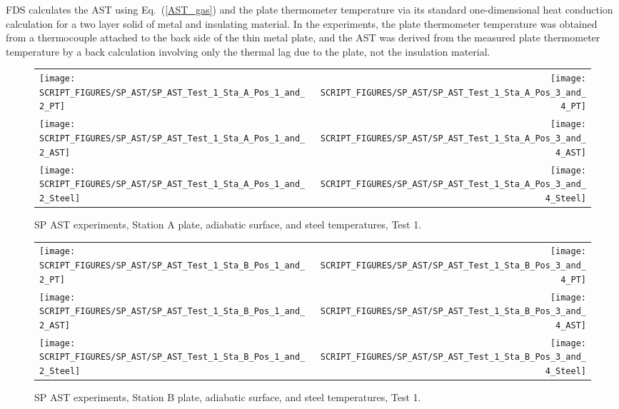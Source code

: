 FDS calculates the AST using Eq.~(\ref{AST_gas}) and the plate thermometer temperature via its standard one-dimensional heat conduction calculation for a
two layer solid of metal and insulating material. In the experiments, the plate thermometer temperature was obtained from a thermocouple attached to the back side of
the thin metal plate, and the AST was derived from the measured plate thermometer temperature by a back calculation involving only the thermal lag due to the
plate, not the insulation material.

\newpage


\begin{figure}[p]
\begin{tabular*}{\textwidth}{l@{\extracolsep{\fill}}r}
\texttt{[image: SCRIPT\_FIGURES/SP\_AST/SP\_AST\_Test\_1\_Sta\_A\_Pos\_1\_and\_2\_PT]} &
\texttt{[image: SCRIPT\_FIGURES/SP\_AST/SP\_AST\_Test\_1\_Sta\_A\_Pos\_3\_and\_4\_PT]} \\
\texttt{[image: SCRIPT\_FIGURES/SP\_AST/SP\_AST\_Test\_1\_Sta\_A\_Pos\_1\_and\_2\_AST]} &
\texttt{[image: SCRIPT\_FIGURES/SP\_AST/SP\_AST\_Test\_1\_Sta\_A\_Pos\_3\_and\_4\_AST]} \\
\texttt{[image: SCRIPT\_FIGURES/SP\_AST/SP\_AST\_Test\_1\_Sta\_A\_Pos\_1\_and\_2\_Steel]} &
\texttt{[image: SCRIPT\_FIGURES/SP\_AST/SP\_AST\_Test\_1\_Sta\_A\_Pos\_3\_and\_4\_Steel]}
\end{tabular*}
\caption{SP AST experiments, Station A plate, adiabatic surface, and steel temperatures, Test 1.}
\label{SP_Test_1_Station_A}
\end{figure}

\begin{figure}[p]
\begin{tabular*}{\textwidth}{l@{\extracolsep{\fill}}r}
\texttt{[image: SCRIPT\_FIGURES/SP\_AST/SP\_AST\_Test\_1\_Sta\_B\_Pos\_1\_and\_2\_PT]} &
\texttt{[image: SCRIPT\_FIGURES/SP\_AST/SP\_AST\_Test\_1\_Sta\_B\_Pos\_3\_and\_4\_PT]} \\
\texttt{[image: SCRIPT\_FIGURES/SP\_AST/SP\_AST\_Test\_1\_Sta\_B\_Pos\_1\_and\_2\_AST]} &
\texttt{[image: SCRIPT\_FIGURES/SP\_AST/SP\_AST\_Test\_1\_Sta\_B\_Pos\_3\_and\_4\_AST]} \\
\texttt{[image: SCRIPT\_FIGURES/SP\_AST/SP\_AST\_Test\_1\_Sta\_B\_Pos\_1\_and\_2\_Steel]} &
\texttt{[image: SCRIPT\_FIGURES/SP\_AST/SP\_AST\_Test\_1\_Sta\_B\_Pos\_3\_and\_4\_Steel]}
\end{tabular*}
\caption{SP AST experiments, Station B plate, adiabatic surface, and steel temperatures, Test 1.}
\label{SP_Test_1_Station_B}
\end{figure}

